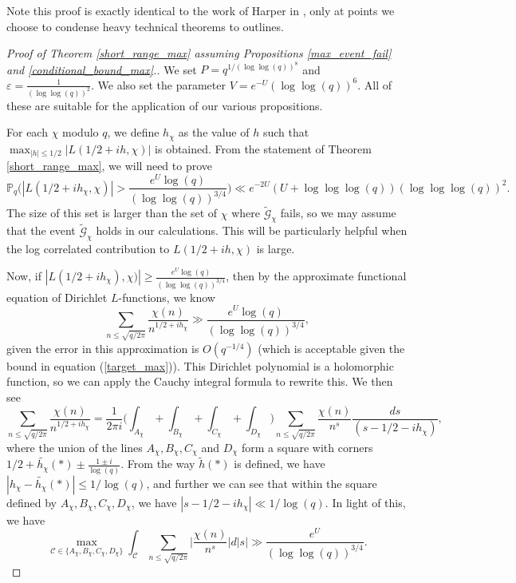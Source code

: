 \documentclass[reqno]{amsart}
\theoremstyle{definition}
\theoremstyle{remark}
\numberwithin{equation}{section}
\theoremstyle{remark}
\begin{document}
Note this proof is exactly identical to the work of Harper in \cite{harper2019partition}, only at points we choose to condense heavy technical theorems to outlines.
\begin{proof}[Proof of Theorem \ref{short_range_max} assuming Propositions \ref{max_event_fail} and \ref{conditional_bound_max}.]
    We set $P= q^{1/(\log\log(q))^8}$ and $\varepsilon = \frac{1}{(\log\log(q))^2}$. We also set the parameter $V=e^{-U}(\log\log(q))^6$. All of these are suitable for the application of our various propositions. \par
    For each $\chi$ modulo $q$, we define $h_\chi$ as the value of $h$ such that $\max_{|h| \leq1/2}|L(1/2+ih,\chi)|$ is obtained. From the statement of Theorem \ref{short_range_max}, we will need to prove
    \begin{equation}
        \mathbb{P}_q\big(|L(1/2+ih_\chi,\chi)|>\frac{e^{U}\log(q)}{(\log\log(q))^{3/4}}\big) \ll e^{-2U}(U+\log\log\log(q))(\log\log\log(q))^2. \label{target_max}
    \end{equation}
    The size of this set is larger than the set of $\chi$ where $\widetilde{\mathcal{G}}_\chi$ fails, so we may assume that the event $\widetilde{\mathcal{G}}_\chi$ holds in our calculations. This will be particularly helpful when the log correlated contribution to $L(1/2+ih,\chi)$ is large. \par
    Now, if $|L(1/2+ih_\chi),\chi)| \geq \frac{e^{U}\log(q)}{(\log\log(q))^{3/4}}$, then by the approximate functional equation of Dirichlet $L$-functions, we know
    $$\sum_{n \leq \sqrt{q/2\pi}}\frac{\chi(n)}{n^{1/2+ih_\chi}} \gg \frac{e^{U}\log(q)}{(\log\log(q))^{3/4}},$$
    given the error in this approximation is $O(q^{-1/4})$ (which is acceptable given the bound in equation (\ref{target_max})). This Dirichlet polynomial is a holomorphic function, so we can apply the Cauchy integral formula to rewrite this. We then see
    $$\sum_{n \leq \sqrt{q/2\pi}}\frac{\chi(n)}{n^{1/2+ih_\chi}} = \frac{1}{2\pi i}\big(\int_{A_\chi}+\int_{B_\chi}+\int_{C_\chi}+\int_{D_\chi}\big)\sum_{n \leq \sqrt{q/2\pi}}\frac{\chi(n)}{n^{s}}\frac{ds}{(s-1/2-ih_\chi)},$$
    where the union of the lines $A_\chi, B_\chi, C_\chi$ and $D_\chi$ form a square with corners $1/2+ \tilde{h_\chi}(*) \pm\frac{1 \pm i}{\log(q)}$. From the way $\tilde{h}(*)$ is defined, we have $|h_\chi-\tilde{h_\chi}(*)| \leq 1/\log(q)$, and further we can see that within the square defined by $A_\chi, B_\chi, C_\chi, D_\chi$, we have $|s-1/2-ih_\chi| \ll 1/\log(q)$. In light of this, we have
    $$\max_{\mathcal{C} \in \{A_\chi,B_\chi,C_\chi,D_\chi\}}\int_{\mathcal{C}}\sum_{n \leq \sqrt{q/2\pi}}\big|\frac{\chi(n)}{n^{s}}\big|d|s|  \gg \frac{e^{U}}{(\log\log(q))^{3/4}}.$$

\end{proof}
\end{document}
